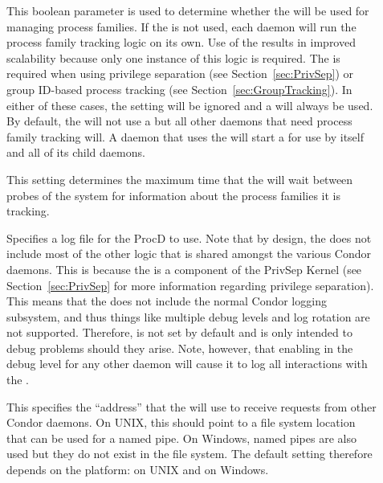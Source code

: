 \begin{description}

\item[]\label{param:UseProcd} This boolean parameter
is used to determine whether the  will be used for
managing process families. If the  is not used, each
daemon will run the process family tracking logic on its own. Use of
the  results in improved scalability because only one
instance of this logic is required. The  is required
when using privilege separation (see Section~\ref{sec:PrivSep}) or
group ID-based process tracking (see
Section~\ref{sec:GroupTracking}). In either of these cases, the
 setting will be ignored and a  will
always be used. By default, the  will not use a
 but all other daemons that need process family tracking
will.
A daemon that uses the  will start a  for
use by itself and all of its child daemons.

\item[]\label{param:ProcdMaxSnapshotInterval}
This setting determines the maximum time that the  will
wait between probes of the system for information about the process
families it is tracking.

\item[]\label{param:ProcdLog} Specifies a log file
for the ProcD to use. Note that by design, the  does not
include most of the other logic that is shared amongst the various
Condor daemons. This is because the  is a component of
the PrivSep Kernel (see Section~\ref{sec:PrivSep} for more information
regarding privilege separation). This means that the 
does not include the normal Condor logging subsystem, and thus things
like multiple debug levels and log rotation are not
supported. Therefore,  is not set by default and
is only intended to debug problems should they arise. Note, however,
that enabling  in the debug level for any other
daemon will cause it to log all interactions with the .

\item[]\label{param:ProcdAddress} This specifies
the ``address'' that the  will use to receive requests
from other Condor daemons. On UNIX, this should point to a file system
location that can be used for a named pipe. On Windows, named pipes
are also used but they do not exist in the file system. The default
setting therefore depends on the platform: 
on UNIX and
on Windows.

\end{description}

